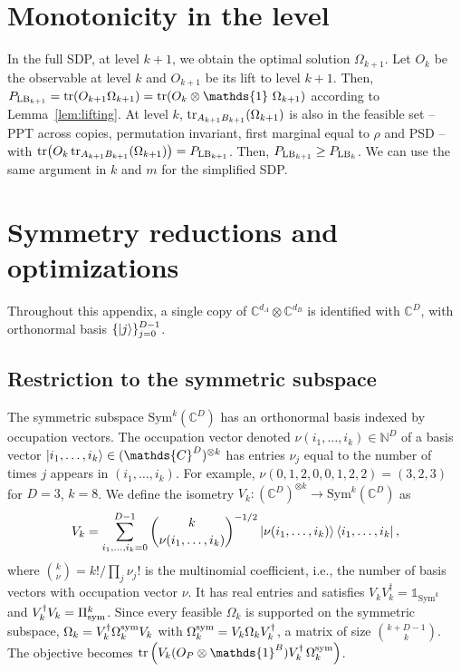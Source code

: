 \documentclass[aps,pra,twocolumn,superscriptaddress]{revtex4-2}
\newcommand{\one}{\mathds{1}}
\newcommand{\I}{\one}
\newcommand{\N}{\mathds{N}}
\newcommand{\C}{\mathds{C}}
\begin{document}
\begin{widetext}
\section{Monotonicity in the level}\label{app:monotonicity}
In the full SDP, at level $k+1$, we obtain the optimal solution $\Omega_{k+1}$. Let $O_k$ be the observable at level $k$ and $O_{k+1}$ be its lift to level $k+1$. Then, $P_{{\rm LB}_{k+1}} = \tr(O_{k+1} \Omega_{k+1})=\tr(O_k \otimes \I \ \Omega_{k+1})$ according to Lemma~\ref{lem:lifting}. At level $k$, $\tr_{A_{k+1}B_{k+1}}(\Omega_{k+1})$ is also in the feasible set -- PPT across copies, permutation invariant, first marginal equal to $\rho$ and PSD -- with $\tr(O_k \tr_{A_{k+1}B_{k+1}}(\Omega_{k+1})) = P_{{\rm LB}_{k+1}}$. Then, $P_{{\rm LB}_{k+1}} \geq P_{{\rm LB}_{k}}$.
We can use the same argument in $k$ and $m$ for the simplified SDP.

\section{Symmetry reductions and optimizations}\label{app:SymRed}
Throughout this appendix, a single copy of $\C^{d_A}\otimes\C^{d_B}$ is identified with $\C^D$, with orthonormal basis $\{\ket{j}\}_{j=0}^{D-1}$.

\subsection{Restriction to the symmetric subspace}
The symmetric subspace $\text{Sym}^k(\C^D)$ has an orthonormal basis indexed by occupation vectors. The occupation vector denoted $\nu(i_1,\dots,i_k)\in\N^D$ of a basis vector $\ket{i_1,\dots,i_k}\in(\C^D)^{\otimes k}$ has entries $\nu_j$ equal to the number of times $j$ appears in $(i_1,\dots,i_k)$. For example, $\nu(0,1,2,0,0,1,2,2)=(3,2,3)$ for $D=3$, $k=8$. We define the isometry $V_k:(\C^D)^{\otimes k}\to\text{Sym}^k(\C^D)$ as
\begin{equation}
    V_k = \sum_{i_1, \dots, i_k=0}^{D-1} \binom{k}{\nu(i_1, \dots, i_k)}^{-1/2}\ket{\nu(i_1, \dots, i_k)}\bra{i_1, \dots, i_k},
\end{equation}
where $\binom{k}{\nu}=k!/\prod_j\nu_j!$ is the multinomial coefficient, i.e., the number of basis vectors with occupation vector $\nu$. It has real entries and satisfies $V_kV_k^\dagger=\I_{\text{Sym}^k}$ and $V_k^\dagger V_k=\Pi_{\rm sym}^{k}$. Since every feasible $\Omega_k$ is supported on the symmetric subspace, $\Omega_k=V_k^\dagger\Omega_k^{\rm sym}V_k$ with $\Omega_k^{\rm sym}=V_k\Omega_kV_k^\dagger$, a matrix of size $\binom{k+D-1}{k}$. The objective becomes $\tr\left(V_k(O_P\otimes\I^B)V_k^\dagger\,\Omega_k^{\rm sym}\right)$.


\end{widetext}
\end{document}
